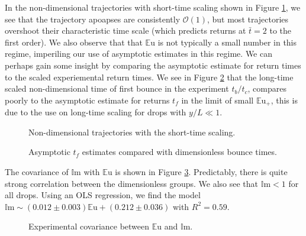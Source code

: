 \documentclass[12pt,a4paper,oneside]{book}
\begin{document}
In the non-dimensional trajectories with short-time scaling shown in Figure \ref{fig:series_s_ds}, we see that the trajectory apoapses are consistently $\mathcal{O}(1)$, but most trajectories overshoot their characteristic time scale (which predicts returns at $\bar{t}  =2$ to the first order). We also observe that that $\mathbb{E}\mbox{u}$ is not typically a small number in this regime, imperiling our use of asymptotic estimates in this regime. We can perhaps gain some insight by comparing the asymptotic estimate for return times to the scaled experiemental return times. We see in Figure \ref{fig:times} that the long-time scaled non-dimensional time of first bounce in the experiment $t_b / t_c$, compares poorly to the asymptotic estimate for returns $t_f$ in the limit of small $\mathbb{E}\mbox{u}_+$, this is due to the use on long-time scaling for drops with $y/L \ll 1$.   
\begin{figure}[htb]
    \centering
    
    \caption{Non-dimensional trajectories with the short-time scaling.\label{fig:series_s_ds}}
\end{figure}

\begin{figure}[htb]
    \centering
    
    \caption{Asymptotic $t_f$ estimates compared with dimensionless bounce times.\label{fig:times}}
\end{figure}

The covariance of $\mathbb{I}\mbox{m}$ with $\mathbb{E}\mbox{u}$ is shown in Figure \ref{fig:dnumbs}. Predictably, there is quite strong correlation between the dimensionless groups. We also see that $\mathbb{I}\mbox{m} < 1$ for all drops. Using an OLS regression, we find the model $\mathbb{I}\mbox{m} \sim (0.012 \pm 0.003) \mathbb{E}\mbox{u} + (0.212 \pm 0.036) $ with $R^2 =0.59$.
\begin{figure}[htb]
    \centering
    
    \caption{Experimental covariance between $\mathbb{E}\mbox{u}$ and $\mathbb{I}\mbox{m}$.\label{fig:dnumbs}}
\end{figure}
\end{document}
